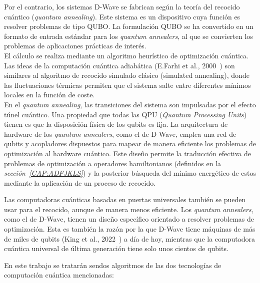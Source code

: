 Por el contrario, los sistemas D-Wave se fabrican según la teoría del recocido cuántico (\textit{quantum annealing}).
Este sistema es un dispositivo cuya función es resolver problemas de tipo QUBO\@.
La formulación QUBO se ha convertido en un formato de entrada estándar para los \textit{quantum annealers}, al que se convierten los problemas de aplicaciones prácticas de interés.
\\
El cálculo se realiza mediante un algoritmo heurístico de optimización cuántica.
Las ideas de la computación cuántica adiabática (E.Farhi et al., 2000~\cite{aqc}) son similares al algoritmo de recocido simulado clásico (simulated annealing), donde las fluctuaciones térmicas permiten que el sistema salte entre diferentes mínimos locales en la función de coste.
\\
En el \textit{quantum annealing}, las transiciones del sistema son impulsadas por el efecto túnel cuántico.
Una propiedad que todas las QPU (\textit{Quantum Processing Units}) tienen es que la disposición física de los qubits es fija.
La arquitectura de hardware de los \textit{quantum annealers}, como el de D-Wave, emplea una red de qubits y acopladores dispuestos para mapear de manera eficiente los problemas de optimización al hardware cuántico.
Este diseño permite la traducción efectiva de problemas de optimización a operadores hamiltonianos (definidos en la \textit{sección~\ref{CAP:ADFJKLS}}) y la posterior búsqueda del mínimo energético de estos mediante la aplicación de un proceso de recocido.

Las computadoras cuánticas basadas en puertas universales también se pueden usar para el recocido, aunque de manera menos eficiente.
Los \textit{quantum annealers}, como el de D-Wave, tienen un diseño específico orientado a resolver problemas de optimización.
Esta es también la razón por la que D-Wave tiene máquinas de más de miles de qubits (King et al., 2022~\cite{2000_dwave-King_2022}) a día de hoy, mientras que la computadora cuántica universal de última generación tiene solo unos cientos de qubits\cite{ibm_roadmap}.

En este trabajo se tratarán sendos algoritmos de las dos tecnologías de computación cuántica mencionadas:

